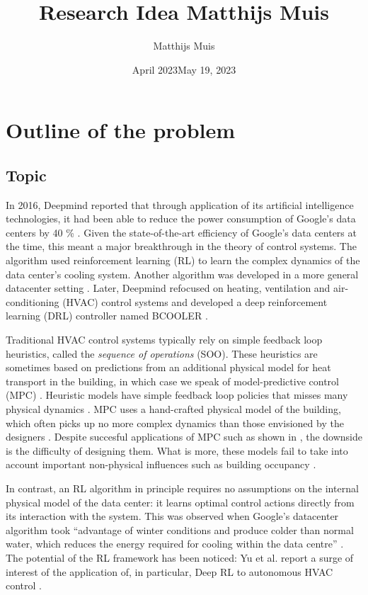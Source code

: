 \documentclass{article}
\title{Research Idea Matthijs Muis}
\author{Matthijs Muis}
\date{April 2023}
\title{\thesistitle}
\author{\thesisauthorfirst}
\date{May 19, 2023}
\theoremstyle{definition}
\theoremstyle{remark}
\begin{document}
\maketitle
\tableofcontents

\newpage

\section{Outline of the problem}
\subsection{Topic}
In 2016, Deepmind reported that through application of its artificial intelligence technologies, it had been able to reduce the power consumption of Google's data centers by 40 \% \cite{evans_gao_2016}. Given the state-of-the-art efficiency of Google's data centers at the time, this meant a major breakthrough in the theory of control systems. The algorithm used reinforcement learning (RL) to learn the complex dynamics of the data center's cooling system. Another algorithm was developed in a more general datacenter setting \cite{gamble_gao_2018}. Later, Deepmind refocused on heating, ventilation and air-conditioning (HVAC) control systems and developed a deep reinforcement learning (DRL) controller named BCOOLER \cite{luo2022controlling}. 

Traditional HVAC control systems typically rely on simple feedback loop heuristics, called the \textit{sequence of operations} (SOO). These heuristics are sometimes based on predictions from an additional physical model for heat transport in the building, in which case we speak of model-predictive control (MPC) \cite{Schwenzer_Ay_Bergs_Abel_2021}. Heuristic models have simple feedback loop policies that misses many physical dynamics \cite{killian2016ten, Schwenzer_Ay_Bergs_Abel_2021}. MPC uses a hand-crafted physical model of the building, which often picks up no more complex dynamics than those envisioned by the designers \cite{luo2022controlling}. Despite succesful applications of MPC such as shown in \cite{privara2011modeling}, the downside is the difficulty of designing them. What is more, these models fail to take into account important non-physical influences such as building occupancy \cite{killian2016ten}. 

In contrast, an RL algorithm in principle requires no assumptions on the internal physical model of the data center: it learns optimal control actions directly from its interaction with the system. This was observed when Google's datacenter algorithm took ``advantage of winter conditions and produce colder than normal water, which reduces the energy required for cooling within the data centre'' \cite{gamble_gao_2018}. The potential of the RL framework has been noticed: Yu et al. report a surge of interest of the application of, in particular, Deep RL to autonomous HVAC control \cite{Yuetal}.
\end{document}
